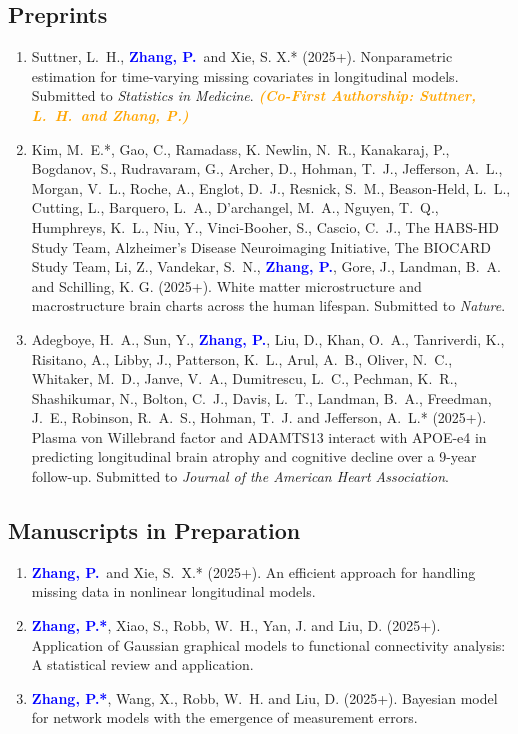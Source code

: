 \documentclass[12pt]{article}
\newcommand{\PZ}{\textcolor{blue}{\textbf{Zhang, P.*}}}
\newcommand{\PZnot}{\textcolor{blue}{\textbf{Zhang, P.}}}
\newcommand{\orange}[1]{\textcolor{orange}{#1}}
\begin{document}
	\subsection*{Preprints}
	\begin{enumerate}							 		
		\item {\sc Suttner, L.\ H.,} \PZnot\ and {\sc Xie, S. X.*} 
		(2025+). Nonparametric estimation for time-varying missing 
		covariates in longitudinal models. Submitted to {\em 
		Statistics in Medicine}. \orange{\bf \em (Co-First 
		Authorship: 
		Suttner, L.\ H.\ and Zhang, P.)}
		
		\item {\sc Kim, M.\ E.*, Gao, C., Ramadass, K. Newlin, N.\ 
		R., Kanakaraj, P., Bogdanov, S., Rudravaram, G., Archer, D., 
		Hohman, T.\ J., Jefferson, A.\ L., Morgan, V.\ L., Roche, A., 
		Englot, D.\ J., Resnick, S.\ M., Beason-Held, L.\ L., 
		Cutting, L., Barquero, L.\ A., D'archangel, M.\ A., Nguyen, 
		T.\ Q., Humphreys, K.\ L., Niu, Y., Vinci-Booher, S., Cascio, 
		C.\ J., The HABS-HD Study Team, Alzheimer’s Disease 
		Neuroimaging Initiative, The BIOCARD Study Team, Li, Z., 
		Vandekar, S.\ N.,} \PZnot, {\sc Gore, J., Landman, B.\ A.} 
		and {\sc Schilling, K. G.} (2025+). White matter 
		microstructure and macrostructure brain charts across the 
		human lifespan. Submitted to {\em Nature}.
		
		\item {\sc Adegboye, H.\ A., Sun, Y.}, \PZnot, {\sc Liu, D., 
		Khan, O.\ A., Tanriverdi, K., Risitano, A., Libby, J., 
		Patterson, K.\ L., Arul, A.\ B., Oliver, N.\ C., Whitaker, 
		M.\ D., Janve, V.\ A., Dumitrescu, L.\ C., Pechman, K.\ R., 
		Shashikumar, N., Bolton, C.\ J., Davis, L.\ T., Landman, B.\ 
		A., Freedman, J.\ E., Robinson, R.\ A.\ S., Hohman, T.\ J.} 
		and {\sc Jefferson, A.\ L.*} (2025+). Plasma von Willebrand 
		factor and ADAMTS13 interact with APOE-e4 in predicting 
		longitudinal brain atrophy and cognitive decline over a 
		9-year follow-up. Submitted to {\em Journal of the American 
		Heart Association}.
	\end{enumerate}
	
	\subsection*{Manuscripts in Preparation}
	\begin{enumerate}
		\item \PZnot\ and {\sc Xie, S.\ X.*} (2025+). An efficient 
		approach for handling missing data in nonlinear longitudinal
		models.	
		
		\item \PZ, {\sc Xiao, S., Robb, W.\ H., Yan, J.} and {\sc 
		Liu, D.} (2025+).
		Application of Gaussian graphical models to functional 
		connectivity analysis: A statistical review and application.
		
		\item \PZ, {\sc Wang, X., Robb, W.\ H.} and {\sc Liu, D.} 
		(2025+). Bayesian model for network models with the 
		emergence of measurement errors.
	\end{enumerate}
	
\end{document}
